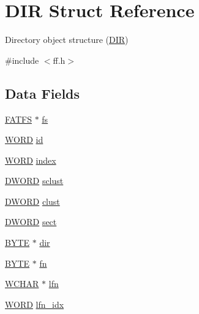 \hypertarget{structDIR}{\section{D\-I\-R Struct Reference}
\label{structDIR}
}


Directory object structure (\hyperlink{structDIR}{D\-I\-R})  




{\ttfamily \#include $<$ff.\-h$>$}

\subsection*{Data Fields}
\begin{DoxyCompactItemize}
\item 
\hyperlink{structFATFS}{F\-A\-T\-F\-S} $\ast$ \hyperlink{structDIR_a312eaa66cb703fb2993ea98173dc0c9a}{fs}
\item 
\hyperlink{integer_8h_a197942eefa7db30960ae396d68339b97}{W\-O\-R\-D} \hyperlink{structDIR_aca2c95a99a04173917ec70c030891383}{id}
\item 
\hyperlink{integer_8h_a197942eefa7db30960ae396d68339b97}{W\-O\-R\-D} \hyperlink{structDIR_ab95119fbacbe45e3e9ee0f962b844092}{index}
\item 
\hyperlink{integer_8h_ad342ac907eb044443153a22f964bf0af}{D\-W\-O\-R\-D} \hyperlink{structDIR_a9212af5877b94d790dd3bab3aa320994}{sclust}
\item 
\hyperlink{integer_8h_ad342ac907eb044443153a22f964bf0af}{D\-W\-O\-R\-D} \hyperlink{structDIR_acfbb8ba2d6e73b6f999ceffd1857c190}{clust}
\item 
\hyperlink{integer_8h_ad342ac907eb044443153a22f964bf0af}{D\-W\-O\-R\-D} \hyperlink{structDIR_ad01fcc812ed0dad11a593574336adc9e}{sect}
\item 
\hyperlink{integer_8h_a4ae1dab0fb4b072a66584546209e7d58}{B\-Y\-T\-E} $\ast$ \hyperlink{structDIR_a6c2a8c0cf2d55ae99775e93a16593449}{dir}
\item 
\hyperlink{integer_8h_a4ae1dab0fb4b072a66584546209e7d58}{B\-Y\-T\-E} $\ast$ \hyperlink{structDIR_a32da2f31d6c3b6c42eef981cb0cfd2ee}{fn}
\item 
\hyperlink{integer_8h_a570001c92f314285ad3e7139d8c58cf7}{W\-C\-H\-A\-R} $\ast$ \hyperlink{structDIR_af62fd789383e6f1397f74617e11c135d}{lfn}
\item 
\hyperlink{integer_8h_a197942eefa7db30960ae396d68339b97}{W\-O\-R\-D} \hyperlink{structDIR_acad41b18758c9278c14d47076e8149fc}{lfn\-\_\-idx}
\end{DoxyCompactItemize}


